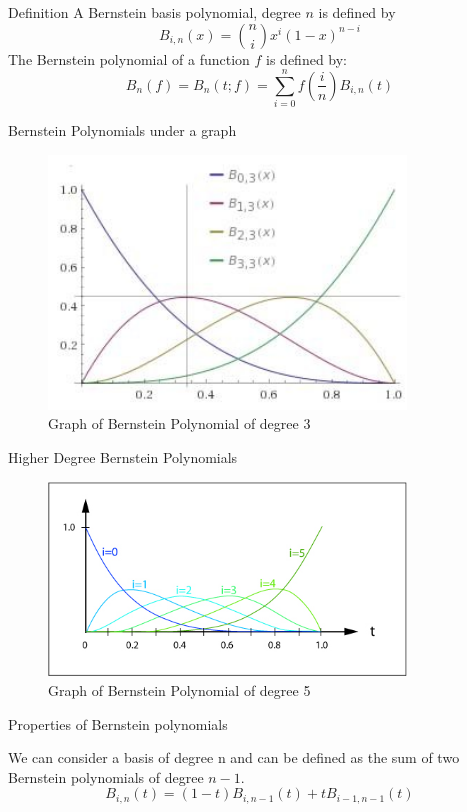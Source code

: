 \documentclass[mathserif,serif]{beamer}
\begin{document}
\begin{frame}{Definition}
A Bernstein basis polynomial, degree $n$ is defined by
\begin{equation}
\label{eq:bp:1}
 B_{i,n}(x)=\binom{n}{i}x^i(1-x)^{n-i} 
\end{equation}
The Bernstein polynomial of a function $f$ is defined by:
\begin{equation}
B_n(f)=B_n(t;f)=\sum_{i=0}^nf(\frac{i}{n})B_{i,n}(t)   
\end{equation}    
\end{frame}
\begin{frame}{Bernstein Polynomials under a graph}
\begin{figure}
\centering
\includegraphics[width=95mm]{BP.jpg}
\caption{Graph of Bernstein Polynomial of degree 3}
\label{fig:1}
\end{figure}    
\end{frame}
\begin{frame}{Higher Degree Bernstein Polynomials}
\begin{figure}
\centering
\includegraphics[width=95mm]{BP5.jpg}
\caption{Graph of Bernstein Polynomial of degree 5}
\end{figure} 
\end{frame}
\begin{frame}{Properties of Bernstein polynomials}
\begin{theorem}
We can consider a basis of degree n and can be defined as the sum of two Bernstein polynomials of degree $n-1$.
\begin{equation*}
B_{i,n}(t)=(1-t)B_{i,n-1}(t)+tB_{i-1,n-1}(t)    
\end{equation*}
\end{theorem}
\end{frame}
\end{document}
